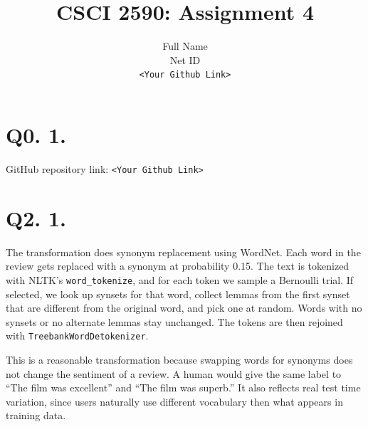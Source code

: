\documentclass{article}
\title{CSCI 2590: Assignment 4}
\author{Full Name \\ Net ID \\ \texttt{<Your Github Link>}}
\date{}
\begin{document}
\maketitle

\section*{Q0. 1.}
GitHub repository link: \texttt{<Your Github Link>}

\section*{Q2. 1.}

The transformation does synonym replacement using WordNet. Each word in the review gets replaced with a synonym at probability 0.15. The text is tokenized with NLTK's \texttt{word\_tokenize}, and for each token we sample a Bernoulli trial. If selected, we look up synsets for that word, collect lemmas from the first synset that are different from the original word, and pick one at random. Words with no synsets or no alternate lemmas stay unchanged. The tokens are then rejoined with \texttt{TreebankWordDetokenizer}.

This is a reasonable transformation because swapping words for synonyms does not change the sentiment of a review. A human would give the same label to ``The film was excellent'' and ``The film was superb.'' It also reflects real test time variation, since users naturally use different vocabulary then what appears in training data.
\end{document}
